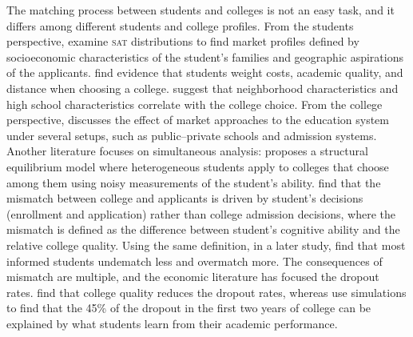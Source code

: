 \documentclass[5p,authoryear,preprint,12pt]{elsarticle}
\begin{document}
The matching process between students and colleges is not an easy task, and it differs among different students and college profiles. From the students perspective, \citet{zemsky1983} examine \textsc{sat} distributions to find market profiles defined by socioeconomic characteristics of the student's families and geographic aspirations of the applicants. \citet{manski1983} find evidence that students weight costs, academic quality, and distance when choosing a college. \citet{hoxby2013} suggest that neighborhood characteristics and high school characteristics correlate with the college choice. From the college perspective, \citep{robert2010} discusses the effect of market approaches to the education system under several setups, such as public--private schools and admission systems. Another literature focuses on simultaneous analysis: \citet{fu2014} proposes a structural equilibrium model where heterogeneous students apply to colleges that choose among them using noisy measurements of the student's ability. \citet{dillon2017} find that the mismatch between college and applicants is driven by student's decisions (enrollment and application) rather than college admission decisions, where the mismatch is defined as the difference between student's cognitive ability and the relative college quality. Using the same definition, in a later study, \citep{dillon2017} find that most informed students undematch less and overmatch more. The consequences of mismatch are multiple, and the economic literature has focused the dropout rates. \citet{dillon2018} find that college quality reduces the dropout rates, whereas \citet{stinebrickner2014} use simulations to find that the 45\% of the dropout in the first two years of college can be explained by what students learn from their academic performance.


\end{document}
